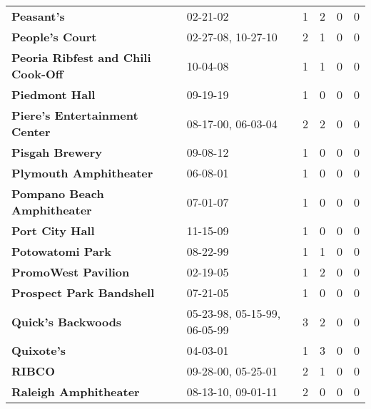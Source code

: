 \begin{supertabular}{llllll}
                                                   \textbf{Peasant's} &                      02-21-02 &  1 &   2 &  0 &  0 \\
                                              \textbf{People's Court} &            02-27-08, 10-27-10 &  2 &   1 &  0 &  0 \\
                           \textbf{Peoria Ribfest and Chili Cook-Off} &                      10-04-08 &  1 &   1 &  0 &  0 \\
                                               \textbf{Piedmont Hall} &                      09-19-19 &  1 &   0 &  0 &  0 \\
                                \textbf{Piere's Entertainment Center} &            08-17-00, 06-03-04 &  2 &   2 &  0 &  0 \\
                                              \textbf{Pisgah Brewery} &                      09-08-12 &  1 &   0 &  0 &  0 \\
                                       \textbf{Plymouth Amphitheater} &                      06-08-01 &  1 &   0 &  0 &  0 \\
                                  \textbf{Pompano Beach Amphitheater} &                      07-01-07 &  1 &   0 &  0 &  0 \\
                                              \textbf{Port City Hall} &                      11-15-09 &  1 &   0 &  0 &  0 \\
                                             \textbf{Potowatomi Park} &                      08-22-99 &  1 &   1 &  0 &  0 \\
                                          \textbf{PromoWest Pavilion} &                      02-19-05 &  1 &   2 &  0 &  0 \\
                                     \textbf{Prospect Park Bandshell} &                      07-21-05 &  1 &   0 &  0 &  0 \\
                                           \textbf{Quick's Backwoods} &  05-23-98, 05-15-99, 06-05-99 &  3 &   2 &  0 &  0 \\
                                                   \textbf{Quixote's} &                      04-03-01 &  1 &   3 &  0 &  0 \\
                                                       \textbf{RIBCO} &            09-28-00, 05-25-01 &  2 &   1 &  0 &  0 \\
                                        \textbf{Raleigh Amphitheater} &            08-13-10, 09-01-11 &  2 &   0 &  0 &  0 \\

\end{supertabular}
